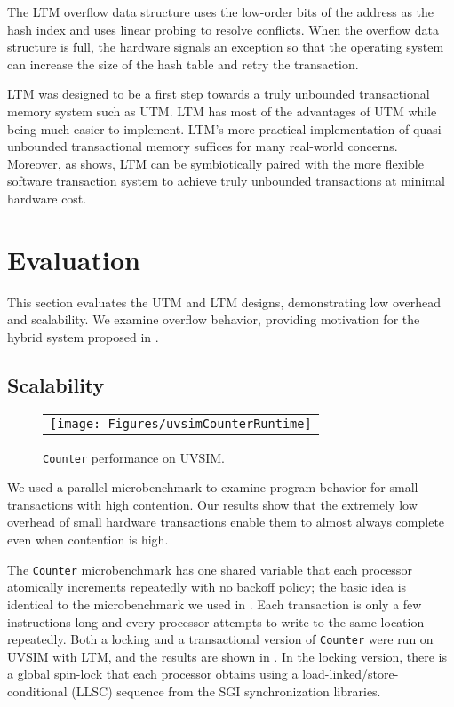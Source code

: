 The LTM overflow data structure uses the low-order bits of the address
as the hash index and uses linear probing to resolve conflicts.  When
the overflow data structure is full, the hardware signals an exception
so that the operating system can increase the size of the hash table
and retry the transaction.

LTM was designed to be a first step towards a truly unbounded
transactional memory system such as UTM\@.  LTM has most of the
advantages of UTM while being much easier to implement. LTM's
more practical implementation of quasi-unbounded transactional memory
suffices for many real-world concerns.  Moreover, as 
shows, LTM can be symbiotically paired
with the more flexible \apex software transaction system to achieve
truly unbounded transactions at minimal hardware cost.

\section{Evaluation}\label{sec:htm-benchmarks}
This section evaluates the UTM and LTM designs,
demonstrating low overhead and scalability.  We examine
overflow behavior, providing motivation for the hybrid
system proposed in .

\subsection{Scalability}\label{sec:htm-counter}

\begin{figure}
\begin{center}
\begin{tabular}{c}
\texttt{[image: Figures/uvsimCounterRuntime]}
\end{tabular}
\end{center}
\caption{\texttt{Counter} performance on UVSIM\@.}
\label{fig:microbenchperf}
\end{figure}

We used a parallel microbenchmark to examine
program behavior for small transactions with high contention. Our
results show that the extremely low overhead of small hardware transactions
enable them to almost always complete even when contention is high.

The \texttt{Counter} microbenchmark has one shared variable that each
processor atomically increments repeatedly with no backoff
policy; the basic idea is identical to the microbenchmark we used in
.
Each transaction is only a few instructions long and every
processor attempts to write to the same location repeatedly.  Both a
locking and a transactional version of \texttt{Counter} were run on
UVSIM with LTM, and the results are shown in
. In the locking version, there is a global
spin-lock that each processor obtains using a
load-linked/store-conditional (LLSC) sequence from the SGI
synchronization libraries.

